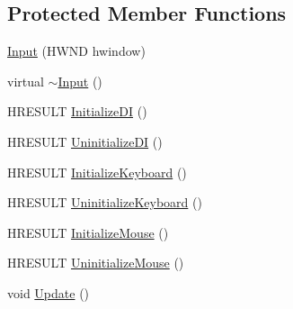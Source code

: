 \subsection*{Protected Member Functions}
\begin{DoxyCompactItemize}
\item 
\hyperlink{classmage_1_1_input_a036b38f787b45d14ff92f360303b33af}{Input} (H\+W\+ND hwindow)
\item 
virtual \hyperlink{classmage_1_1_input_add0881945eee81e9a2bee7fe677c96fb}{$\sim$\+Input} ()
\item 
H\+R\+E\+S\+U\+LT \hyperlink{classmage_1_1_input_a010d3a793119e8f3cc3988bb867e5050}{Initialize\+DI} ()
\item 
H\+R\+E\+S\+U\+LT \hyperlink{classmage_1_1_input_ab4bb88712da71911b5a5fe8e5643ba12}{Uninitialize\+DI} ()
\item 
H\+R\+E\+S\+U\+LT \hyperlink{classmage_1_1_input_ab7e61b7a81ce17aa2f959a18387922a6}{Initialize\+Keyboard} ()
\item 
H\+R\+E\+S\+U\+LT \hyperlink{classmage_1_1_input_a2ecac65f7733e361181fecba896ae7bb}{Uninitialize\+Keyboard} ()
\item 
H\+R\+E\+S\+U\+LT \hyperlink{classmage_1_1_input_a134b0a317bb6709b03995e04c2e3d3f1}{Initialize\+Mouse} ()
\item 
H\+R\+E\+S\+U\+LT \hyperlink{classmage_1_1_input_a364ebf732efbd775e8f91ed646a36412}{Uninitialize\+Mouse} ()
\item 
void \hyperlink{classmage_1_1_input_ab152509540c3f41d337296edc2aea660}{Update} ()
\end{DoxyCompactItemize}

